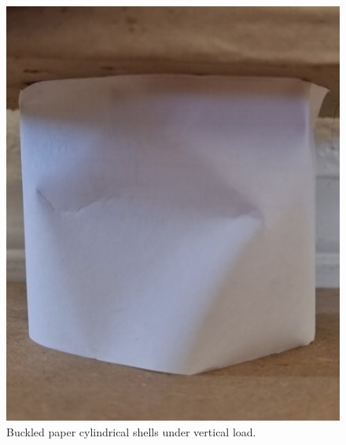 \begin{figure}
\includegraphics[scale=0.42]{figures/Buckling_3.jpg}\quad
\caption{Buckled paper cylindrical shells under vertical load.}
\end{figure}


